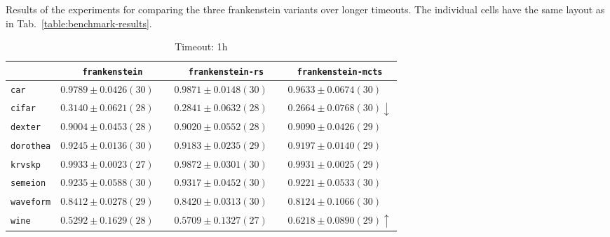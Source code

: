 \begin{table}[ht]
    \caption[Results of the experiments for comparing the three frankenstein variants over longer timeouts.]{
        Results of the experiments for comparing the three frankenstein variants over longer timeouts.
        The individual cells have the same layout as in Tab.~\ref{table:benchmark-results}.
    }
    \label{table:influence-results}
    \renewcommand{\arraystretch}{1.25}
    \begin{subtable}{\textwidth}
        \centering
        \caption{Timeout: 1h}
        \begin{tabular}{l|ccc}
            & \texttt{frankenstein}  & \texttt{frankenstein-rs}  & \texttt{frankenstein-mcts} \\
            \hline
            \texttt{car} & $ 0.9789 \pm 0.0426 (30) \phantom{\downarrow}$ & $ \boldsymbol{0.9871} \pm 0.0148 (30) \phantom{\downarrow}$ & $ 0.9633 \pm 0.0674 (30) \phantom{\downarrow}$\\
            \texttt{cifar} & $ \boldsymbol{0.3140} \pm 0.0621 (28) \phantom{\downarrow}$ & $ 0.2841 \pm 0.0632 (28) \phantom{\downarrow}$ & $ 0.2664 \pm 0.0768 (30) \downarrow$\\
            \texttt{dexter} & $ 0.9004 \pm 0.0453 (28) \phantom{\downarrow}$ & $ 0.9020 \pm 0.0552 (28) \phantom{\downarrow}$ & $ \boldsymbol{0.9090} \pm 0.0426 (29) \phantom{\downarrow}$\\
            \texttt{dorothea} & $ \boldsymbol{0.9245} \pm 0.0136 (30) \phantom{\downarrow}$ & $ 0.9183 \pm 0.0235 (29) \phantom{\downarrow}$ & $ 0.9197 \pm 0.0140 (29) \phantom{\downarrow}$\\
            \texttt{krvskp} & $ \boldsymbol{0.9933} \pm 0.0023 (27) \phantom{\downarrow}$ & $ 0.9872 \pm 0.0301 (30) \phantom{\downarrow}$ & $ 0.9931 \pm 0.0025 (29) \phantom{\downarrow}$\\
            \texttt{semeion} & $ 0.9235 \pm 0.0588 (30) \phantom{\downarrow}$ & $ \boldsymbol{0.9317} \pm 0.0452 (30) \phantom{\downarrow}$ & $ 0.9221 \pm 0.0533 (30) \phantom{\downarrow}$\\
            \texttt{waveform} & $ 0.8412 \pm 0.0278 (29) \phantom{\downarrow}$ & $ \boldsymbol{0.8420} \pm 0.0313 (30) \phantom{\downarrow}$ & $ 0.8124 \pm 0.1066 (30) \phantom{\downarrow}$\\
            \texttt{wine} & $ 0.5292 \pm 0.1629 (28) \phantom{\downarrow}$ & $ 0.5709 \pm 0.1327 (27) \phantom{\downarrow}$ & $ \boldsymbol{0.6218} \pm 0.0890 (29) \uparrow$\\

\end{tabular}
\end{subtable}
\end{table}
